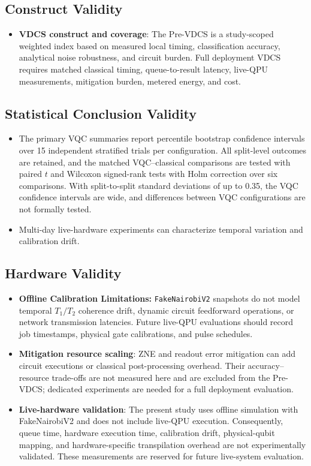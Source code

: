 \documentclass[final,5p,times,number]{elsarticle}
\begin{document}
\subsection{Construct Validity}
\begin{itemize}[leftmargin=*]
  \item \textbf{VDCS construct and coverage}: The Pre-VDCS is a study-scoped weighted index based on measured local timing, classification accuracy, analytical noise robustness, and circuit burden. Full deployment VDCS requires matched classical timing, queue-to-result latency, live-QPU measurements, mitigation burden, metered energy, and cost.
\end{itemize}

\subsection{Statistical Conclusion Validity}
\begin{itemize}[leftmargin=*]
  \item The primary VQC summaries report percentile bootstrap confidence
intervals over 15 independent stratified trials per configuration. All split-level outcomes are retained, and the matched VQC--classical comparisons are tested with paired $t$ and Wilcoxon signed-rank tests with Holm correction over six comparisons. With split-to-split standard deviations of up to 0.35, the VQC confidence intervals are wide, and differences between VQC configurations are not formally tested.
  \item Multi-day live-hardware experiments can characterize temporal variation and calibration drift.
\end{itemize}

\subsection{Hardware Validity}
\begin{itemize}[leftmargin=*]
  \item \textbf{Offline Calibration Limitations:} \texttt{FakeNairobiV2} snapshots do not model temporal $T_1/T_2$ coherence drift, dynamic circuit feedforward operations, or network transmission latencies. Future live-QPU evaluations should record job timestamps, physical gate calibrations, and pulse schedules.
  \item \textbf{Mitigation resource scaling}: ZNE and readout error mitigation can add circuit executions or classical post-processing overhead. Their accuracy--resource trade-offs are not measured here and are excluded from the Pre-VDCS; dedicated experiments are needed for a full deployment evaluation.
  \item \textbf{Live-hardware validation}: The present study uses offline simulation with FakeNairobiV2 and does not include live-QPU
execution. Consequently, queue time, hardware execution time, calibration drift, physical-qubit mapping, and hardware-specific
transpilation overhead are not experimentally validated. These measurements are reserved for future live-system evaluation.
\end{itemize}
\end{document}

